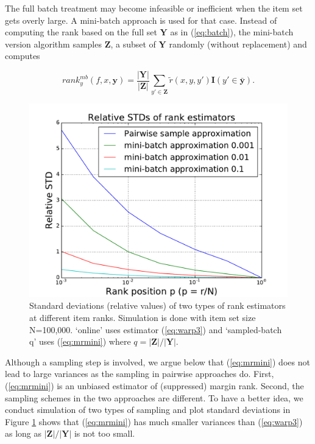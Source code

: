 \documentclass[letterpaper]{article} %
\begin{document}
The full batch treatment may become infeasible or inefficient when the item set gets overly large. A mini-batch approach is used for that case. Instead of computing the rank based on the full set $\textbf{Y}$ as in (\ref{eq:batch}), the mini-batch version algorithm samples $\textbf{Z}$, a subset of $\textbf{Y}$ randomly (without replacement) and computes

\begin{equation}
\label{eq:mrmini}
rank^{mb}_y(f,x,\textbf{y}) = \frac{|\textbf{Y}|}{|\textbf{Z}|}\sum_{y'\in \textbf{Z}} \tilde{r}(x,y,y') \textbf{I} (y'\in\bar{\textbf{y}}).
\end{equation}

\begin{figure}%
\centering
\includegraphics[width=0.89\columnwidth]{pics/std-eps-converted-to}
\caption{Standard deviations (relative values) of two types of rank estimators at different item ranks. Simulation is done with item set size N=100,000. `online' uses estimator (\ref{eq:warp3}) and `sampled-batch q' uses (\ref{eq:mrmini}) where $q=|\textbf{Z}|/|\textbf{Y}|$.}
\label{pic:std}
\end{figure}


Although a sampling step is involved, we argue below that (\ref{eq:mrmini}) does not lead to large variances as the sampling in pairwise approaches do. First, (\ref{eq:mrmini}) is an unbiased estimator of (suppressed) margin rank. Second, the sampling schemes in the two approaches are different. To have a better idea, we conduct simulation of two types of sampling and plot standard deviations in Figure \ref{pic:std} shows that (\ref{eq:mrmini}) has much smaller variances than (\ref{eq:warp3}) as long as $|\textbf{Z}|/|\textbf{Y}|$ is not too small.
\end{document}
